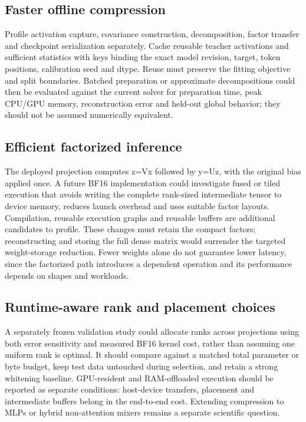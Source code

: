 \documentclass[10pt]{article}
\begin{document}
\subsection{Faster offline compression}

Profile activation capture, covariance construction, decomposition, factor transfer and checkpoint serialization separately. Cache reusable teacher activations and sufficient statistics with keys binding the exact model revision, target, token positions, calibration seed and dtype. Reuse must preserve the fitting objective and split boundaries. Batched preparation or approximate decompositions could then be evaluated against the current solver for preparation time, peak CPU/GPU memory, reconstruction error and held-out global behavior; they should not be assumed numerically equivalent.

\subsection{Efficient factorized inference}

The deployed projection computes z=Vx followed by y=Uz, with the original bias applied once. A future BF16 implementation could investigate fused or tiled execution that avoids writing the complete rank-sized intermediate tensor to device memory, reduces launch overhead and uses suitable factor layouts. Compilation, reusable execution graphs and reusable buffers are additional candidates to profile. These changes must retain the compact factors; reconstructing and storing the full dense matrix would surrender the targeted weight-storage reduction. Fewer weights alone do not guarantee lower latency, since the factorized path introduces a dependent operation and its performance depends on shapes and workloads.

\subsection{Runtime-aware rank and placement choices}

A separately frozen validation study could allocate ranks across projections using both error sensitivity and measured BF16 kernel cost, rather than assuming one uniform rank is optimal. It should compare against a matched total parameter or byte budget, keep test data untouched during selection, and retain a strong whitening baseline. GPU-resident and RAM-offloaded execution should be reported as separate conditions: host-device transfers, placement and intermediate buffers belong in the end-to-end cost. Extending compression to MLPs or hybrid non-attention mixers remains a separate scientific question.
\end{document}

